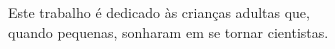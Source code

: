 \begin{dedicatoria}
   \vspace*{\fill}
   \begin{flushright}
     Este trabalho é dedicado às crianças adultas que,\\
     quando pequenas, sonharam em se tornar cientistas.
   \end{flushright}
   \vspace*{\fill}
\end{dedicatoria}
